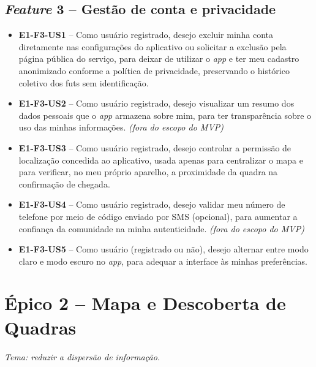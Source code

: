 \begin{apendicesenv}
    \subsection*{\textit{Feature} 3 -- Gestão de conta e privacidade}
    \begin{itemize}
        \item \textbf{E1-F3-US1} -- Como usuário registrado, desejo excluir minha conta diretamente nas configurações do aplicativo ou solicitar a exclusão pela página pública do serviço, para deixar de utilizar o \textit{app} e ter meu cadastro anonimizado conforme a política de privacidade, preservando o histórico coletivo dos futs sem identificação.
        \item \textbf{E1-F3-US2} -- Como usuário registrado, desejo visualizar um resumo dos dados pessoais que o \textit{app} armazena sobre mim, para ter transparência sobre o uso das minhas informações. \textit{(fora do escopo do MVP)}
        \item \textbf{E1-F3-US3} -- Como usuário registrado, desejo controlar a permissão de localização concedida ao aplicativo, usada apenas para centralizar o mapa e para verificar, no meu próprio aparelho, a proximidade da quadra na confirmação de chegada.
        \item \textbf{E1-F3-US4} -- Como usuário registrado, desejo validar meu número de telefone por meio de código enviado por SMS (opcional), para aumentar a confiança da comunidade na minha autenticidade. \textit{(fora do escopo do MVP)}
        \item \textbf{E1-F3-US5} -- Como usuário (registrado ou não), desejo alternar entre modo claro e modo escuro no \textit{app}, para adequar a interface às minhas preferências.
    \end{itemize}

    \section*{Épico 2 -- Mapa e Descoberta de Quadras}
    \textit{Tema: reduzir a dispersão de informação.}


\end{apendicesenv}
